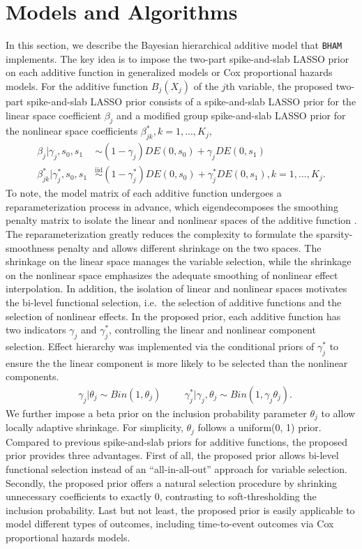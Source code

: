 \documentclass[
]{jss}
\begin{document}
\section{Models and Algorithms}

In this section, we describe the Bayesian hierarchical additive model
that \texttt{BHAM} implements. The key idea is to impose the two-part
spike-and-slab LASSO prior \cite{guo2022_GAM} on each additive function
in generalized models or Cox proportional hazards models. For the
additive function \(B_j(X_j)\) of the \(j\)th variable, the proposed
two-part spike-and-slab LASSO prior consists of a spike-and-slab LASSO
prior for the linear space coefficient \(\beta_j\) and a modified group
spike-and-slab LASSO prior for the nonlinear space coefficients
\(\beta_{jk}^*, k = 1,..., K_j\), \begin{align}
  \beta_{j} | \gamma_{j},s_0,s_1 &\sim (1-\gamma_{j}) DE(0, s_0) + \gamma_{j} DE(0, s_1)\nonumber \\
  \beta^*_{jk} | \gamma^*_{j},s_0,s_1 &\overset{\text{iid}}{\sim}(1-\gamma_{j}^*) DE(0, s_0) + \gamma_{j}^*DE(0, s_1), k=1,\dots, K_j.
\end{align} To note, the model matrix of each additive function
undergoes a reparameterization process in advance, which eigendecomposes
the smoothing penalty matrix to isolate the linear and nonlinear spaces
of the additive function \citep{wood2017}. The reparameterization
greatly reduces the complexity to formulate the sparsity-smoothness
penalty \citep{meier2009} and allows different shrinkage on the two
spaces. The shrinkage on the linear space manages the variable
selection, while the shrinkage on the nonlinear space emphasizes the
adequate smoothing of nonlinear effect interpolation. In addition, the
isolation of linear and nonlinear spaces motivates the bi-level
functional selection, i.e.~the selection of additive functions and the
selection of nonlinear effects. In the proposed prior, each additive
function has two indicators \(\gamma_{j}\) and \(\gamma^*_{j}\),
controlling the linear and nonlinear component selection. Effect
hierarchy was implemented via the conditional priors of \(\gamma^*_{j}\)
to ensure the the linear component is more likely to be selected than
the nonlinear components. \begin{align}
&\gamma_{j} | \theta_j \sim Bin(1, \theta_j) & & 
&\gamma_{j}^*| \gamma_{j}, \theta_j \sim Bin(1, \gamma_{j}\theta_j).
\end{align} We further impose a beta prior on the inclusion probability
parameter \(\theta_j\) to allow locally adaptive shrinkage. For
simplicity, \(\theta_j\) follows a uniform(0, 1) prior. Compared to
previous spike-and-slab priors \citep{scheipl2012, bai2021} for additive
functions, the proposed prior provides three advantages. First of all,
the proposed prior allows bi-level functional selection instead of an
``all-in-all-out'' approach for variable selection. Secondly, the
proposed prior offers a natural selection procedure by shrinking
unnecessary coefficients to exactly 0, contrasting to soft-thresholding
the inclusion probability. Last but not least, the proposed prior is
easily applicable to model different types of outcomes, including
time-to-event outcomes via Cox proportional hazards models.
\end{document}
